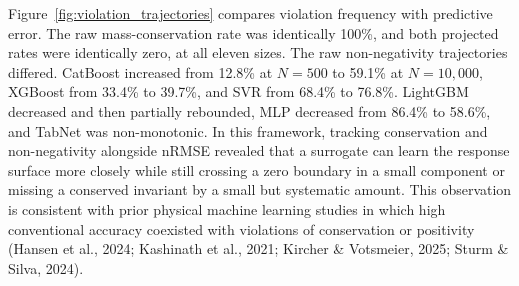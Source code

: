 \documentclass[a4paper,fleqn]{cas-sc}
\begin{document}
\FloatBarrier
\begin{table}[H]
\centering
\caption{Mass-conservation and non-negativity diagnostics at $N=10{,}000$. Raw rates and displacement are five-fold means. Every projected mass-conservation and non-negativity violation rate was zero.}
\label{tab:projection_physics}
\scriptsize
{}
\end{table}
\FloatBarrier

Figure~\ref{fig:violation_trajectories} compares violation frequency with predictive error. The raw mass-conservation rate was identically 100\%, and both projected rates were identically zero, at all eleven sizes. The raw non-negativity trajectories differed. CatBoost increased from 12.8\% at $N=500$ to 59.1\% at $N=10{,}000$, XGBoost from 33.4\% to 39.7\%, and SVR from 68.4\% to 76.8\%. LightGBM decreased and then partially rebounded, MLP decreased from 86.4\% to 58.6\%, and TabNet was non-monotonic. In this framework, tracking conservation and non-negativity alongside nRMSE revealed that a surrogate can learn the response surface more closely while still crossing a zero boundary in a small component or missing a conserved invariant by a small but systematic amount. This observation is consistent with prior physical machine learning studies in which high conventional accuracy coexisted with violations of conservation or positivity (Hansen et al., 2024; Kashinath et al., 2021; Kircher \& Votsmeier, 2025; Sturm \& Silva, 2024).
\end{document}
